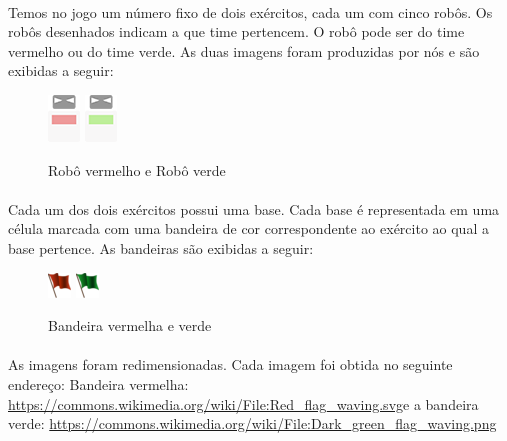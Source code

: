 \documentclass[a4paper]{article}
\begin{document}
 \paragraph{}
 Temos no jogo um número fixo de dois exércitos, cada um com cinco robôs. Os robôs desenhados indicam a que time pertencem. O robô pode ser do time vermelho ou do time verde. As duas imagens foram produzidas por nós e são exibidas a seguir:
 
 \begin{figure}[h]
 \begin{center}
 \includegraphics[scale=0.8]{rr.png}
 \includegraphics[scale=0.8]{rg.png}
 \caption{Robô vermelho e Robô verde}
 \label{fig:rbot}
 \end{center} 
 \end{figure}
 
 \paragraph{}
 Cada um dos dois exércitos possui uma base. Cada base é representada em uma célula marcada com uma bandeira de cor correspondente ao exército ao qual a base pertence. As bandeiras são exibidas a seguir:
 
 \begin{figure}[h]
 \begin{center}
 \includegraphics[scale=0.8]{rf.png}
 \includegraphics[scale=0.8]{gf.png}
 \caption{Bandeira vermelha e verde}
 \label{fig:flags}
 \end{center} 
 \end{figure}
 
 \paragraph{}
 As imagens foram redimensionadas. Cada imagem foi obtida no seguinte endereço:
Bandeira vermelha: \url{https://commons.wikimedia.org/wiki/File:Red_flag_waving.svg}e a bandeira verde: \url{https://commons.wikimedia.org/wiki/File:Dark_green_flag_waving.png}

 
\end{document}
